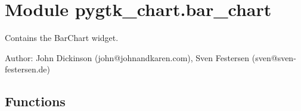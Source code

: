 %
%
%


\section{Module pygtk\_chart.bar\_chart}

    \label{pygtk_chart:bar_chart}
Contains the BarChart widget.

Author: John Dickinson (john@johnandkaren.com), Sven Festersen 
(sven@sven-festersen.de)



  \subsection{Functions}

    \label{pygtk_chart:bar_chart:draw_rounded_rectangle}

    \vspace{0.5ex}


